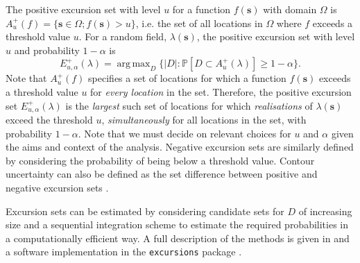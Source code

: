 \documentclass{stylefile16/statsoc}
\newcommand{\bs}{\mathbf{s}}
\DeclareMathOperator*{\argmax}{arg\,max}  %
\begin{document}
The positive excursion set with level $u$ for a function $f(\bs)$ with domain $\Omega$ is $A_u^{+}(f) = \{ \bs \in \Omega ; f(\bs) > u \}$, i.e. the set of all locations in $\Omega$ where $f$ exceeds a threshold value $u$. For a random field, $\lambda(\bs)$, the positive excursion set with level $u$ and probability $1 - \alpha$ is
\begin{equation*}
E_{u,\alpha}^{+}(\lambda) = \argmax_{D}\{\lvert D \rvert : \mathbb{P}\left[D \subset A_u^{+}(\lambda)\right] \geq 1 - \alpha \} .
\end{equation*}
Note that $A_u^{+}(f)$ specifies a set of locations for which a function $f(\bs)$ exceeds a threshold value $u$ for \textit{every location} in the set. Therefore, the positive excursion set $E_{u,\alpha}^{+}(\lambda)$ is the \textit{largest} such set of locations for which \textit{realisations} of $\lambda(\bs)$ exceed the threshold $u$, \textit{simultaneously} for all locations in the set, with probability $1-\alpha$.  Note that we must decide on relevant choices for $u$ and $\alpha$ given the aims and context of the analysis.  Negative excursion sets are similarly defined by considering the probability of being below a threshold value.  Contour uncertainty can also be defined as the set difference between positive and negative excursion sets \citep{bolin_excursion_2015}.

Excursion sets can be estimated by considering candidate sets for $D$ of increasing size and a sequential integration scheme to estimate the required probabilities in a computationally efficient way.  A full description of the methods is given in \cite{bolin_excursion_2015} and a software implementation in the \texttt{excursions} package \citep{bolin_calculating_2018}.  
\end{document}
